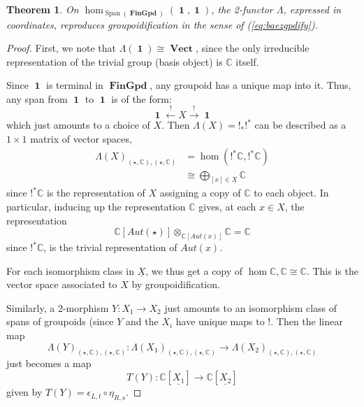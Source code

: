 \documentclass[10pt]{amsart}
\newtheorem{theorem}{Theorem}
\numberwithin{theorem}{subsection}
\newcommand{\ra}{\mathop{\rightarrow}}
\newcommand{\la}{\mathop{\leftarrow}}
\newcommand{\opname}[1]{\operatorname{#1}}
\newcommand{\catname}[1]{\boldsymbol{\opname{{#1}}}}
\newcommand{\Span}{\opname{Span}}
\newcommand{\V}{\catname{Vect}}
\newcommand{\Gpd}{\catname{FinGpd}}
\newcommand{\FV}{\Lambda}
\begin{document}
\begin{theorem}\label{thm:groupoidification}
On $\hom_{\Span(\Gpd)}(\catname{1},\catname{1})$, the 2-functor $\FV$,
expressed in coordinates, reproduces groupoidification in the sense of
(\ref{eq:baezgpdify}).
\end{theorem}
\begin{proof}
First, we note that $\FV(\catname{1}) \cong \V$, since the only
irreducible representation of the trivial group (basis object) is
$\mathbb{C}$ itself.

Since $\catname{1}$ is terminal in $\Gpd$, any groupoid has a unique
map into it.  Thus, any span from $\catname{1}$ to $\catname{1}$ is of
the form:
\begin{equation}
\catname{1} \stackrel{!}{\la} X \stackrel{!}{\ra} \catname{1}
\end{equation}
which just amounts to a choice of $X$.  Then $\FV(X) = !_{\ast}
!^{\ast}$ can be described as a $1 \times 1$ matrix of vector spaces,
\begin{align}
\FV(X)_{(\star,\mathbb{C}),(\star,\mathbb{C})} & = \hom(!^{\ast}\mathbb{C},!^{\ast}\mathbb{C}) \\
 & \cong \bigoplus_{[x] \in \underline{X}} \mathbb{C}
\end{align}
since $!^{\ast}\mathbb{C}$ is the representation of $X$ assigning a
copy of $\mathbb{C}$ to each object.  In particular, inducing up the
representation $\mathbb{C}$ gives, at each $x \in X$, the representation
\begin{equation}
\mathbb{C}[Aut(\star)] \otimes_{\mathbb{C}[Aut(x)]} \mathbb{C} = \mathbb{C}
\end{equation}
since $!^{\ast}\mathbb{C}$, is the trivial representation of $Aut(x)$.

For each isomorphism class in
$\underline{X}$, we thus get a copy of $\hom{\mathbb{C},\mathbb{C}
  \cong \mathbb{C}}$.  This is the vector space associated to $X$ by
  groupoidification.

Similarly, a 2-morphism $Y : X_1 \ra X_2$ just amounts to an
isomorphism class of spans of groupoids (since $Y$ and the $X_i$ have
unique maps to $\catname{!}$.  Then the linear map
\begin{equation}
\FV(Y)_{(\star,\mathbb{C}),(\star,\mathbb{C})} : \FV(X_1)_{(\star,\mathbb{C}),(\star,\mathbb{C})} \ra \FV(X_2)_{(\star,\mathbb{C}),(\star,\mathbb{C})}
\end{equation}
just becomes a map
\begin{equation}
T(Y) : \mathbb{C}[\underline{X_1}] \ra \mathbb{C}[\underline{X_2}]
\end{equation}
given by $T(Y) = \epsilon_{L,t} \circ \eta_{R,s}$.  


\end{proof}
\end{document}
